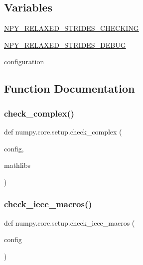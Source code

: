 \subsection*{Variables}
\begin{DoxyCompactItemize}
\item 
\hyperlink{namespacenumpy_1_1core_1_1setup_a9f67647c9a65f2f5583f695a3dbe6b9a}{N\+P\+Y\+\_\+\+R\+E\+L\+A\+X\+E\+D\+\_\+\+S\+T\+R\+I\+D\+E\+S\+\_\+\+C\+H\+E\+C\+K\+I\+NG}
\item 
\hyperlink{namespacenumpy_1_1core_1_1setup_ac855af0d00c9aac7ccde1a1a261434be}{N\+P\+Y\+\_\+\+R\+E\+L\+A\+X\+E\+D\+\_\+\+S\+T\+R\+I\+D\+E\+S\+\_\+\+D\+E\+B\+UG}
\item 
\hyperlink{namespacenumpy_1_1core_1_1setup_aa6819095fc7e037e2a59c9edd2d58787}{configuration}
\end{DoxyCompactItemize}


\subsection{Function Documentation}
\mbox{\label{namespacenumpy_1_1core_1_1setup_ac920fc35f337f94fcf120492b6567f4d}} 
\subsubsection{\texorpdfstring{check\+\_\+complex()}{check\_complex()}}
{\footnotesize\ttfamily def numpy.\+core.\+setup.\+check\+\_\+complex (\begin{DoxyParamCaption}\item[{}]{config,  }\item[{}]{mathlibs }\end{DoxyParamCaption})}

\mbox{\label{namespacenumpy_1_1core_1_1setup_a5535df80d9881c89c7393b422ba1debd}} 
\subsubsection{\texorpdfstring{check\+\_\+ieee\+\_\+macros()}{check\_ieee\_macros()}}
{\footnotesize\ttfamily def numpy.\+core.\+setup.\+check\+\_\+ieee\+\_\+macros (\begin{DoxyParamCaption}\item[{}]{config }\end{DoxyParamCaption})}

